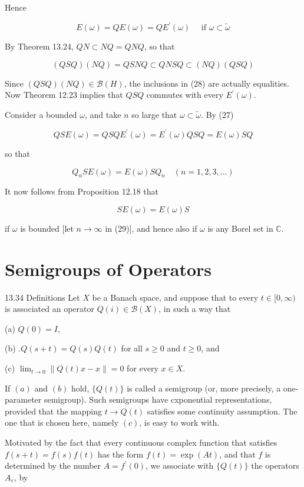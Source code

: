 \documentclass[10pt]{article}
\begin{document}
Hence

$$
E(\omega)=Q E(\omega)=Q E^{\prime}(\omega) \quad \text { if } \omega \subset \tilde{\omega}
$$

By Theorem 13.24, $Q N \subset N Q=Q N Q$, so that

$$
(Q S Q)(N Q)=Q S N Q \subset Q N S Q \subset(N Q)(Q S Q)
$$

Since $(Q S Q)(N Q) \in \mathscr{B}(H)$, the inclusions in (28) are actually equalities. Now Theorem 12.23 implies that $Q S Q$ commutes with every $E^{\prime}(\omega)$.

Consider a bounded $\omega$, and take $n$ so large that $\omega \subset \tilde{\omega}$. By (27)

$$
Q S E(\omega)=Q S Q E^{\prime}(\omega)=E^{\prime}(\omega) Q S Q=E(\omega) S Q
$$

so that

$$
Q_{n} S E(\omega)=E(\omega) S Q_{n} \quad(n=1,2,3, \ldots)
$$

It now follows from Proposition 12.18 that

$$
S E(\omega)=E(\omega) S
$$

if $\omega$ is bounded [let $n \rightarrow \infty$ in (29)], and hence also if $\omega$ is any Borel set in $\mathbb{C}$.

\section{Semigroups of Operators}
13.34 Definitions Let $X$ be a Banach space, and suppose that to every $t \in[0, \infty)$ is associated an operator $Q(i) \in \mathscr{B}(X)$, in such a way that

(a) $Q(0)=I$,

(b) $. Q(s+t)=Q(s) Q(t)$ for all $s \geq 0$ and $t \geq 0$, and

(c) $\lim _{t \rightarrow 0}\|Q(t) x-x\|=0$ for every $x \in X$.

If $(a)$ and $(b)$ hold, $\{Q(t)\}$ is called a semigroup (or, more precisely, a one-parameter semigroup). Such semigroups have cxponential representations, provided that the mapping $t \rightarrow Q(t)$ satisfies some continuity assumption. The one that is chosen here, namely $(c)$, is easy to work with.

Motivated by the fact that every continuous complex function that satisfies $f(s+t)=f(s) f(t)$ has the form $f(t)=\exp (A t)$, and that $f$ is determined by the number $A=f^{\prime}(0)$, we associate with $\{Q(t)\}$ the operators $A_{\varepsilon}$, by
\end{document}
